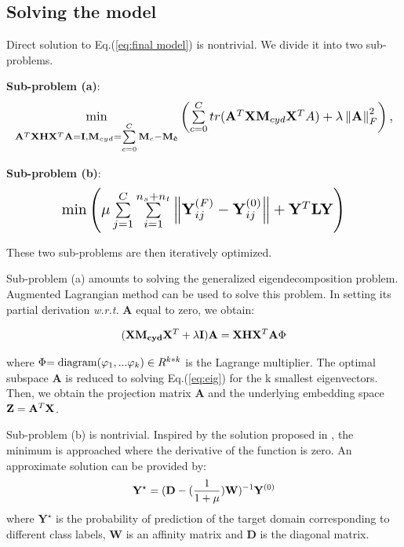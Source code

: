 \documentclass[journal,twocolumn]{IEEEtran}
\begin{document}
\begin{CJK*}{UTF8}{gkai}
\subsection{Solving the model}
\label{subsection:solving the model}

 							
Direct solution to Eq.(\ref{eq:final model}) is nontrivial. We divide it into two sub-problems. 

\textbf{Sub-problem (a)}:
\begin{equation}\label{eq:prob1}
		\resizebox{1\hsize}{!}{%
$\mathop {\min }\limits_{{{\bf{A}}^T}{\bf{XH}}{{\bf{X}}^T}{\bf{A}} = {\bf{I}},{{\bf{M}}_{cyd}} = \sum\limits_{c = 0}^C {{{\bf{M}}_c} - {{\bf{M}}_{{\bf{\hat c}}}}} } \left( {\sum\limits_{c = 0}^C {tr({{\bf{A}}^T}{\bf{X}}{{\bf{M}}_{cyd}}{{\bf{X}}^T}A)}  + \lambda \left\| {\bf{A}} \right\|_F^2} \right),$}
\end{equation}



\textbf{Sub-problem (b)}:
\begin{equation}\label{eq:prob2}
		\resizebox{0.75\hsize}{!}{%
$\min \left( {\mu \sum\limits_{j = 1}^C {\sum\limits_{i = 1}^{{n_s} + {n_t}} {\left\| {{\bf{Y}}_{ij}^{(F)} - {\bf{Y}}_{ij}^{(0)}} \right\|} }  + {{\bf{Y}}^T}{\bf{LY}}} \right)$}
\end{equation}
  
These two sub-problems are then iteratively optimized. 
								
Sub-problem (a) amounts to solving the generalized eigendecomposition problem. Augmented Lagrangian method \cite{fortin2000augmented,long2013transfer} can be used to solve this problem. In setting its partial derivation \textit{w.r.t.} $\boldsymbol{A}$ equal to zero, we obtain:

\begin{equation}\label{eq:eig}
({\bf{X}}{\bf{M_{cyd}}}{{\bf{X}}^T} + \lambda {\bf{I}}){\bf{A}} = {\bf{XH}}{{\bf{X}}^T}{\bf{A}}\Phi 
\end{equation}

where $\Phi {\rm{ = diagram}}({\varphi _1},...{\varphi _k}) \in {R^{k*k}}$ is the Lagrange multiplier. The optimal subspace $\boldsymbol{A}$ is reduced to solving Eq.(\ref{eq:eig}) for the k smallest eigenvectors.  Then, we obtain the projection matrix $\boldsymbol{A}$ and the underlying embedding space ${\bf{Z}} = {{\bf{A}}^T}{\bf{X}}$. 

Sub-problem (b) is  nontrivial. Inspired by the solution proposed in   \cite{Zhou04learningwith} \cite{6341755} \cite{6619251}, the minimum is approached where the derivative of the function is zero.  An approximate solution can be provided by: 
\begin{equation}\label{eq:Y_optimal}
{{\bf{Y}}^ \star } = {({\bf{D}} - (\frac{1}{{1 + \mu }}){\bf{W}})^{ - 1}}{{\bf{Y}}^{(0)}}
\end{equation}
where  $\textbf{Y}^\star$ is the probability of prediction of the target domain corresponding to different class labels,  $\boldsymbol{W}$ is an affinity matrix and $\boldsymbol{D}$ is the diagonal matrix.   


\end{CJK*}
\end{document}
